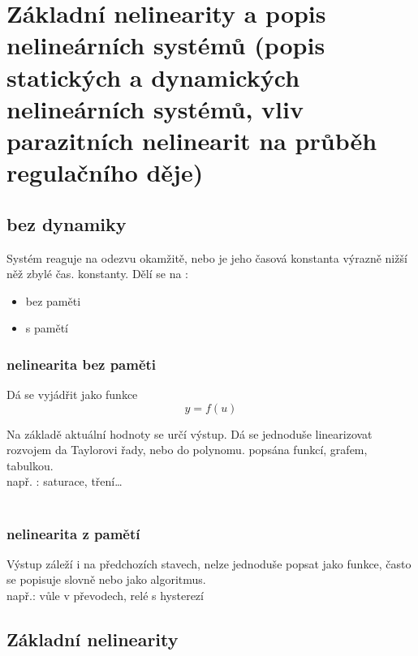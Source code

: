 \section{Základní nelinearity a popis nelineárních systémů (popis statických a dynamických nelineárních systémů,
vliv parazitních nelinearit na průběh regulačního děje)}

\subsection{bez dynamiky}
Systém reaguje na odezvu okamžitě, nebo je jeho časová konstanta výrazně nižší něž zbylé čas. konstanty.
Dělí se na :

\begin{itemize}
    \item bez paměti
    \item s pamětí
\end{itemize}

\subsubsection*{nelinearita bez paměti}

Dá se vyjádřit jako funkce 
\begin{equation}
    y=f(u)
\end{equation}

Na základě aktuální hodnoty se určí výstup. Dá se jednoduše linearizovat rozvojem da Taylorovi řady, nebo do polynomu.
popsána funkcí, grafem, tabulkou.
\\
např. :  saturace, tření\dots
\\
\\
\subsubsection*{nelinearita z pamětí}
Výstup záleží i na předchozích stavech, nelze jednoduše popsat jako funkce, často se popisuje slovně nebo jako algoritmus.
\\
např.: vůle v převodech, relé s hysterezí

\subsection*{Základní nelinearity}

